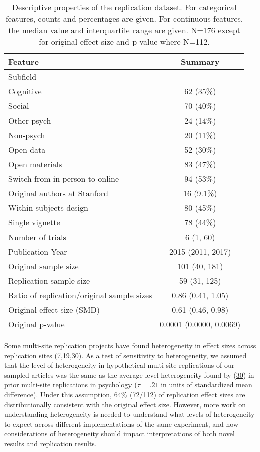 \documentclass[
  english,
  a4paper,
]{article}
\begin{document}
\begin{table}[!h]

\caption{\label{tab:unnamed-chunk-4}Descriptive properties of the replication dataset. For categorical features, counts and percentages are given. For continuous features, the median value and interquartile range are given. N=176 except for original effect size and p-value where N=112. }
\centering
\fontsize{10}{12}\selectfont
\begin{tabular}[t]{lc}
\toprule
Feature & Summary\\
\midrule
Subfield & \\
\hspace{1em}Cognitive & 62 (35\%)\\
\hspace{1em}Social & 70 (40\%)\\
\hspace{1em}Other psych & 24 (14\%)\\
\hspace{1em}Non-psych & 20 (11\%)\\
Open data & 52 (30\%)\\
Open materials & 83 (47\%)\\
Switch from in-person to online & 94 (53\%)\\
Original authors at Stanford & 16 (9.1\%)\\
Within subjects design & 80 (45\%)\\
Single vignette & 78 (44\%)\\
Number of trials & 6 (1, 60)\\
Publication Year & 2015 (2011, 2017)\\
Original sample size & 101 (40, 181)\\
Replication sample size & 59 (31, 125)\\
Ratio of replication/original sample sizes & 0.86 (0.41, 1.05)\\
Original effect size (SMD) & 0.61 (0.46, 0.98)\\
Original p-value & 0.0001 (0.0000, 0.0069)\\
\bottomrule
\end{tabular}
\end{table}

Some multi-site replication projects have found heterogeneity in effect sizes across replication sites (\protect\hyperlink{ref-klein2018}{7},\protect\hyperlink{ref-ebersole2020}{19},\protect\hyperlink{ref-olsson2020}{30}). As a test of sensitivity to heterogeneity, we assumed that the level of heterogeneity in hypothetical multi-site replications of our sampled articles was the same as the average level heterogeneity found by (\protect\hyperlink{ref-olsson2020}{30}) in prior multi-site replications in psychology (\(\tau=.21\) in units of standardized mean difference). Under this assumption, 64\% (72/112) of replication effect sizes are distributionally consistent with the original effect size. However, more work on understanding heterogeneity is needed to understand what levels of heterogeneity to expect across different implementations of the same experiment, and how considerations of heterogeneity should impact interpretations of both novel results and replication results.
\end{document}

